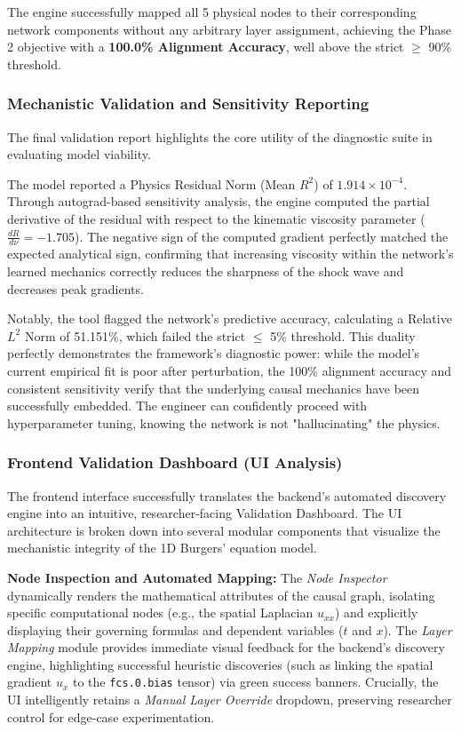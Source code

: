 \documentclass[12pt,singleside,a4paper]{article}
\begin{document}
The engine successfully mapped all 5 physical nodes to their corresponding network components without any arbitrary layer assignment, achieving the Phase 2 objective with a \textbf{100.0\% Alignment Accuracy}, well above the strict $\ge$ 90\% threshold.

\subsubsection{Mechanistic Validation and Sensitivity Reporting}
The final validation report highlights the core utility of the diagnostic suite in evaluating model viability. 

The model reported a Physics Residual Norm (Mean $R^2$) of $1.914 \times 10^{-4}$. Through autograd-based sensitivity analysis, the engine computed the partial derivative of the residual with respect to the kinematic viscosity parameter ($\frac{dR}{d\nu} = -1.705$). The negative sign of the computed gradient perfectly matched the expected analytical sign, confirming that increasing viscosity within the network's learned mechanics correctly reduces the sharpness of the shock wave and decreases peak gradients.

Notably, the tool flagged the network's predictive accuracy, calculating a Relative $L^2$ Norm of 51.151\%, which failed the strict $\le$ 5\% threshold. This duality perfectly demonstrates the framework's diagnostic power: while the model's current empirical fit is poor after perturbation, the 100\% alignment accuracy and consistent sensitivity verify that the underlying causal mechanics have been successfully embedded. The engineer can confidently proceed with hyperparameter tuning, knowing the network is not "hallucinating" the physics.

\subsubsection{Frontend Validation Dashboard (UI Analysis)}
The frontend interface successfully translates the backend's automated discovery engine into an intuitive, researcher-facing Validation Dashboard. The UI architecture is broken down into several modular components that visualize the mechanistic integrity of the 1D Burgers' equation model.

\textbf{Node Inspection and Automated Mapping:}
The \textit{Node Inspector} dynamically renders the mathematical attributes of the causal graph, isolating specific computational nodes (e.g., the spatial Laplacian $u_{xx}$) and explicitly displaying their governing formulas and dependent variables ($t$ and $x$). The \textit{Layer Mapping} module provides immediate visual feedback for the backend's discovery engine, highlighting successful heuristic discoveries (such as linking the spatial gradient $u_x$ to the \texttt{fcs.0.bias} tensor) via green success banners. Crucially, the UI intelligently retains a \textit{Manual Layer Override} dropdown, preserving researcher control for edge-case experimentation.
\end{document}
